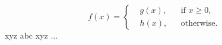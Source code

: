 \[
    f(x) =
    \left\{
        \begin{aligned}
            & g(x), & & \text{if } x \geq 0, \\
            & h(x), & & \text{otherwise.}
        \end{aligned}
    \right.
\]
xyz abc xyz ...
